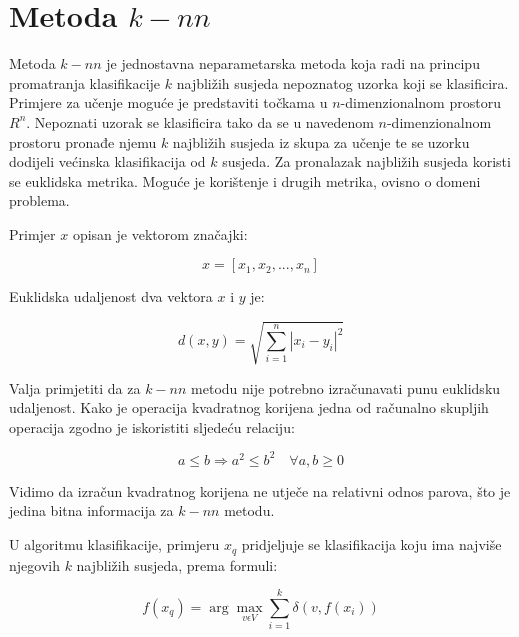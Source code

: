 \documentclass{ru}
\begin{document}
\section{Metoda $k-nn$}


Metoda $k-nn$ je jednostavna neparametarska metoda koja radi na principu
promatranja klasifikacije $k$ najbližih susjeda nepoznatog uzorka koji se
klasificira. Primjere za učenje moguće je predstaviti točkama u
$n$-dimenzionalnom prostoru $R^{n}$. Nepoznati uzorak se klasificira tako da
se u navedenom $n$-dimenzionalnom prostoru pronađe njemu $k$ najbližih susjeda
iz skupa za učenje te se uzorku dodijeli većinska klasifikacija od $k$ susjeda.
Za pronalazak najbližih susjeda koristi se euklidska metrika. Moguće je
korištenje i drugih metrika, ovisno o domeni problema.

Primjer $x$ opisan je vektorom značajki:

\begin{equation}
x = [x_1, x_2, ..., x_n]
\end{equation}

Euklidska udaljenost dva vektora $x$ i $y$ je:

\begin{equation}
d(x, y) = \sqrt{\sum_{i=1}^n |x_i - y_i|^2}
\end{equation}

Valja primjetiti da za $k-nn$ metodu nije potrebno izračunavati punu euklidsku
udaljenost. Kako je operacija kvadratnog korijena jedna od računalno skupljih
operacija zgodno je iskoristiti sljedeću relaciju:

\begin{equation}
a \leq b \Rightarrow a^2 \leq b^2 \quad \forall a,b \geq 0
\end{equation}

Vidimo da izračun kvadratnog korijena ne utječe na relativni odnos parova, što
je jedina bitna informacija za $k-nn$ metodu.

U algoritmu klasifikacije, primjeru $x_q$ pridjeljuje se klasifikacija koju ima najviše njegovih $k$ najbližih
susjeda, prema formuli:

\begin{equation}
f(x_q)=\arg\max_{v \epsilon V} \sum_{i=1}^k \delta(v,f(x_i))
\end{equation}
\end{document}
